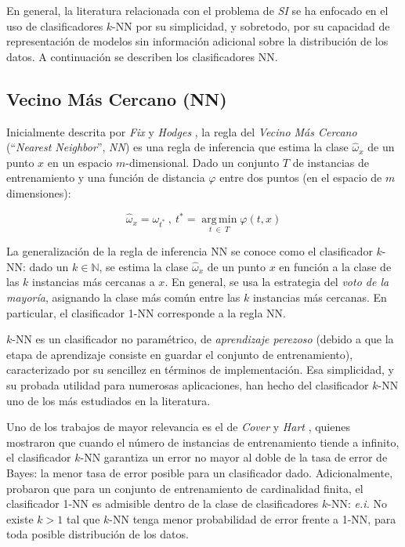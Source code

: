 En general, la literatura relacionada con el problema de \emph{SI} se ha enfocado en el uso de clasificadores $k$-NN por su simplicidad, y sobretodo, por su capacidad de representación de modelos sin información adicional sobre la distribución de los datos. A continuación se describen los clasificadores NN.

\subsection{Vecino Más Cercano (NN)}

Inicialmente descrita por \emph{Fix} y \emph{Hodges} \cite{fix_51_discriminatory}, la regla del \emph{Vecino Más Cercano} (``\emph{Nearest Neighbor}'', \emph{NN}) es una regla de inferencia que estima la clase $\hat{\omega}_x$ de un punto $x$ en un espacio $m$-dimensional. Dado un conjunto $T$ de instancias de entrenamiento y una función de distancia $\varphi$ entre dos puntos (en el espacio de $m$ dimensiones):

\begin{equation}
\hat{\omega}_x = \omega_{t^*}\ ,\ 
t^* = \operatorname*{arg\,min}_{t\ \in\ T} \varphi(t,x)
\end{equation}

La generalización de la regla de inferencia NN se conoce como el clasificador $k$-NN: dado un $k \in \mathbb{N}$, se estima la clase $\hat{\omega}_x$ de un punto $x$ en función a la clase de las $k$ instancias más cercanas a $x$. En general, se usa la estrategia del \guillemotleft\emph{voto de la mayoría}\guillemotright, asignando la clase más común entre las $k$ instancias más cercanas. En particular, el clasificador 1-NN corresponde a la regla NN.

$k$-NN es un clasificador no paramétrico, de \emph{aprendizaje perezoso} (debido a que la etapa de aprendizaje consiste en guardar el conjunto de entrenamiento), caracterizado por su sencillez en términos de implementación. Esa simplicidad, y su probada utilidad para numerosas aplicaciones, han hecho del clasificador $k$-NN uno de los más estudiados en la literatura.

Uno de los trabajos de mayor relevancia es el de \emph{Cover} y \emph{Hart} \cite{Cover:2006:NNP:2263261.2267456}, quienes mostraron que cuando el número de instancias de entrenamiento tiende a infinito, el clasificador $k$-NN garantiza un error no mayor al doble de la tasa de error de Bayes: la menor tasa de error posible para un clasificador dado. Adicionalmente, probaron que para un conjunto de entrenamiento de cardinalidad finita, el clasificador 1-NN es admisible dentro de la clase de clasificadores $k$-NN: \emph{e.i.} No existe $k > 1$ tal que $k$-NN tenga menor probabilidad de error frente a 1-NN, para toda posible distribución de los datos.

